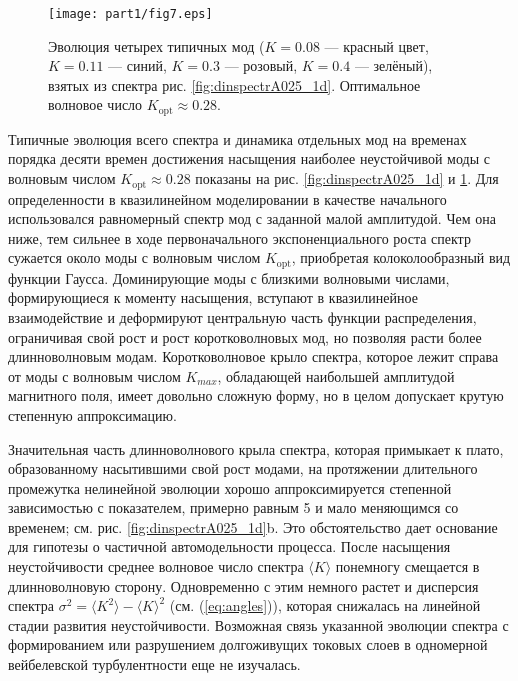 \begin{figure}[t]
\centering
\texttt{[image: part1/fig7.eps]}
\caption{Эволюция четырех типичных мод ($K=0.08$ --- красный цвет, $K=0.11$ --- синий, $K=0.3$ --- розовый, $K=0.4$ --- зелёный), взятых из спектра рис. \ref{fig:dinspectrA025_1d}. Оптимальное волновое число $K_\mathrm{opt}\approx0.28$.}
\label{fig:evol_garmA025_1d}
\end{figure}

Типичные эволюция всего спектра и динамика отдельных мод на временах порядка десяти времен достижения насыщения наиболее неустойчивой моды с волновым числом $K_\mathrm{opt}\approx0.28$ показаны на рис. \ref{fig:dinspectrA025_1d} и \ref{fig:evol_garmA025_1d}. Для определенности в квазилинейном моделировании в качестве начального использовался равномерный спектр мод с заданной малой амплитудой. Чем она ниже, тем сильнее в ходе первоначального экспоненциального роста спектр сужается около моды с волновым числом $K_\mathrm{opt}$, приобретая колоколообразный вид функции Гаусса. Доминирующие моды с близкими волновыми числами, формирующиеся к моменту насыщения, вступают в квазилинейное взаимодействие и деформируют центральную часть функции распределения, ограничивая свой рост и рост коротковолновых мод, но позволяя расти более длинноволновым модам. Коротковолновое крыло спектра, которое лежит справа от моды с волновым числом $K_{max}$, обладающей наибольшей амплитудой магнитного поля, имеет довольно сложную форму, но в целом допускает крутую степенную аппроксимацию.

Значительная часть длинноволнового крыла спектра, которая примыкает к плато, образованному насытившими свой рост модами, на протяжении длительного промежутка нелинейной эволюции хорошо аппроксимируется степенной зависимостью с показателем, примерно равным 5 и мало меняющимся со временем; см. рис. \ref{fig:dinspectrA025_1d}b. Это обстоятельство дает основание для гипотезы о частичной автомодельности процесса. После насыщения неустойчивости среднее волновое число спектра $\langle K\rangle$ понемногу смещается в длинноволновую сторону. Одновременно с этим немного растет и дисперсия спектра $\sigma^2=\langle K^2\rangle-\langle K\rangle^2$ (см. (\ref{eq:angles})), которая снижалась на линейной стадии развития неустойчивости. Возможная связь указанной эволюции спектра с формированием или разрушением долгоживущих токовых слоев в одномерной вейбелевской турбулентности еще не изучалась.

